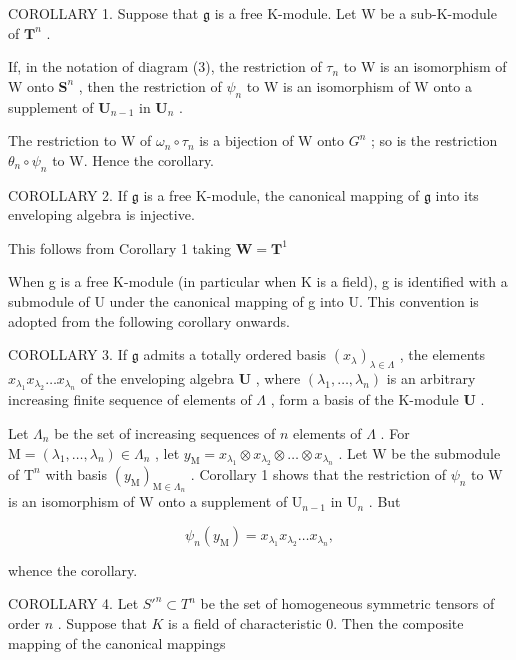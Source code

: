 COROLLARY 1. Suppose that \(\mathfrak{g}\) is a free K-module. Let W be a sub-K-module of \(\mathbf{T}^n\) .

If, in the notation of diagram (3), the restriction of \(\tau_{n}\) to W is an isomorphism of W onto \(\mathbf{S}^n\) , then the restriction of \(\psi_{n}\) to W is an isomorphism of W onto a supplement of \(\mathbf{U}_{n-1}\) in \(\mathbf{U}_n\) .

The restriction to W of \(\omega_{n} \circ \tau_{n}\) is a bijection of W onto \(G^{n}\) ; so is the restriction \(\theta_{n} \circ \psi_{n}\) to W. Hence the corollary.

COROLLARY 2. If \(\mathfrak{g}\) is a free K-module, the canonical mapping of \(\mathfrak{g}\) into its enveloping algebra is injective.

This follows from Corollary 1 taking \(\mathbf{W} = \mathbf{T}^1\)

When g is a free K-module (in particular when K is a field), g is identified with a submodule of U under the canonical mapping of g into U. This convention is adopted from the following corollary onwards.

COROLLARY 3. If \(\mathfrak{g}\) admits a totally ordered basis \((x_{\lambda})_{\lambda \in \Lambda}\) , the elements \(x_{\lambda_1}x_{\lambda_2}\ldots x_{\lambda_n}\) of the enveloping algebra \(\mathbf{U}\) , where \((\lambda_1,\dots ,\lambda_n)\) is an arbitrary increasing finite sequence of elements of \(\Lambda\) , form a basis of the K-module \(\mathbf{U}\) .

Let \(\Lambda_{n}\) be the set of increasing sequences of \(n\) elements of \(\Lambda\) . For \(\mathrm{M} = (\lambda_1, \ldots, \lambda_n) \in \Lambda_n\) , let \(y_{\mathrm{M}} = x_{\lambda_1} \otimes x_{\lambda_2} \otimes \dots \otimes x_{\lambda_n}\) . Let \(\mathrm{W}\) be the submodule of \(\mathrm{T}^n\) with basis \((y_{\mathrm{M}})_{\mathrm{M} \in \Lambda_n}\) . Corollary 1 shows that the restriction of \(\psi_n\) to \(\mathrm{W}\) is an isomorphism of \(\mathrm{W}\) onto a supplement of \(\mathrm{U}_{n-1}\) in \(\mathrm{U}_n\) . But

\[
\psi_ {n} (y _ {\mathrm{M}}) = x _ {\lambda_ {1}} x _ {\lambda_ {2}} \dots x _ {\lambda_ {n}},
\]

whence the corollary.

COROLLARY 4. Let \(S'^{n} \subset T^n\) be the set of homogeneous symmetric tensors of order \(n\) . Suppose that \(K\) is a field of characteristic 0. Then the composite mapping of the canonical mappings

